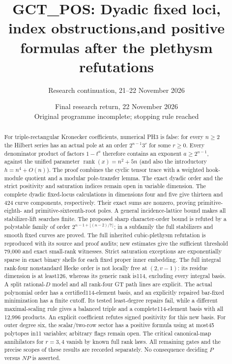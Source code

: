 \documentclass[11pt]{article}
\title{GCT\_POS: Dyadic fixed loci, index obstructions,\newline and positive formulas after the plethysm refutations}
\author{Research continuation, 21--22 November 2026}
\date{Final research return, 22 November 2026\\Original programme incomplete; stopping rule reached}
\theoremstyle{definition}\newtheorem{definition}[theorem]{Definition}
\theoremstyle{remark}\newtheorem{remark}[theorem]{Remark}
\begin{document}
\maketitle
\begin{abstract}
For triple-rectangular Kronecker coefficients, numerical PH3 is false:
for every $n\ge2$ the Hilbert series has an actual pole at an order
$2^{n-1}3^r$ for some $r\ge0$. Every denominator product of factors
$1-t^a$ therefore contains an exponent $a\ge2^{n-1}$, against the
unified parameter $\operatorname{rank}(x)=n^2+5n$ (and also the introductory $h=n^4+O(n)$). The proof combines the cyclic tensor
trace with a weighted hook-module quotient and a modular pole-transfer
lemma. The exact dyadic order and the strict positivity and saturation
indices remain open in variable dimension. The complete dyadic
fixed-locus calculations in dimensions four and five give thirteen
and 424 curve components, respectively. Their exact sums are nonzero,
proving primitive-eighth- and primitive-sixteenth-root poles.
A general incidence-lattice bound makes all stabilizer-lift searches
finite. The proposed sharp character-order bound is refuted by a
polystable family of order $2^{n-1+\lfloor(n-2)/7\rfloor}$;
in a subfamily the full stabilizers and smooth fixed curves are proved.
The full inherited cubic-plethysm refutation is reproduced with its
source and proof audits; new estimates give the sufficient threshold
79,000 and exact small-rank witnesses. Strict saturation exceptions
are exponentially sparse in exact binary shells for each fixed proper
inner embedding. The full integral rank-four nonstandard Hecke order
is not locally free at $(2,v-1)$: its residue dimension is at least126,
whereas its generic rank is114, excluding every integral basis.
A split rational-$D$ model and all rank-four GT path lines are explicit.
The actual polynomial order has a certified114-element basis,
and an explicitly repaired bar-fixed minimization has a finite cutoff.
Its tested least-degree repairs fail, while a different maximal-scaling
rule gives a balanced triple and a complete114-element basis with all
12,996 products. An explicit coefficient refutes signed positivity
for this new basis.
For outer degree six, the scalar/two-row sector has a positive
formula using at most45 polytopes in11 variables; arbitrary flags
remain open.
The critical canonical-map annihilators for $r=3,4$ vanish by known
full rank laws. All remaining gates and the precise scopes of these
results are recorded separately. No consequence deciding $P$ versus
$NP$ is asserted.
\end{abstract}
\tableofcontents
\end{document}
